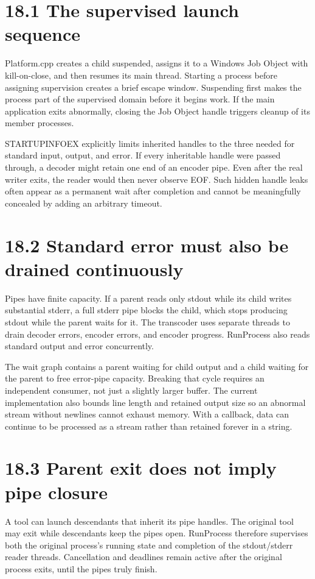 \documentclass[11pt,a4paper,openany]{book}
\begin{document}
\section*{18.1 The supervised launch sequence}
Platform.cpp creates a child suspended, assigns it to a Windows Job Object with kill-on-close, and then resumes its main thread. Starting a process before assigning supervision creates a brief escape window. Suspending first makes the process part of the supervised domain before it begins work. If the main application exits abnormally, closing the Job Object handle triggers cleanup of its member processes.

STARTUPINFOEX explicitly limits inherited handles to the three needed for standard input, output, and error. If every inheritable handle were passed through, a decoder might retain one end of an encoder pipe. Even after the real writer exits, the reader would then never observe EOF. Such hidden handle leaks often appear as a permanent wait after completion and cannot be meaningfully concealed by adding an arbitrary timeout.


\section*{18.2 Standard error must also be drained continuously}
Pipes have finite capacity. If a parent reads only stdout while its child writes substantial stderr, a full stderr pipe blocks the child, which stops producing stdout while the parent waits for it. The transcoder uses separate threads to drain decoder errors, encoder errors, and encoder progress. RunProcess also reads standard output and error concurrently.

The wait graph contains a parent waiting for child output and a child waiting for the parent to free error-pipe capacity. Breaking that cycle requires an independent consumer, not just a slightly larger buffer. The current implementation also bounds line length and retained output size so an abnormal stream without newlines cannot exhaust memory. With a callback, data can continue to be processed as a stream rather than retained forever in a string.


\section*{18.3 Parent exit does not imply pipe closure}
A tool can launch descendants that inherit its pipe handles. The original tool may exit while descendants keep the pipes open. RunProcess therefore supervises both the original process's running state and completion of the stdout/stderr reader threads. Cancellation and deadlines remain active after the original process exits, until the pipes truly finish.
\end{document}
